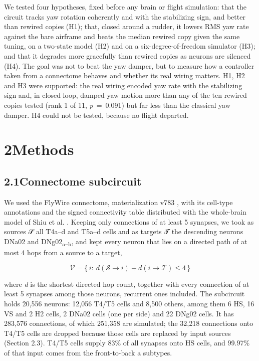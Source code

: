 \documentclass[11pt,letterpaper]{article}
\begin{document}
We tested four hypotheses, fixed before any brain or flight simulation:
that the circuit tracks yaw rotation coherently and with the stabilizing
sign, and better than rewired copies (H1); that, closed around a rudder,
it lowers RMS yaw rate against the bare airframe and beats the median
rewired copy given the same tuning, on a two-state model (H2) and on a
six-degree-of-freedom simulator (H3); and that it degrades more
gracefully than rewired copies as neurons are silenced (H4). The goal
was not to beat the yaw damper, but to measure how a controller taken
from a connectome behaves and whether its real wiring matters. H1, H2
and H3 were supported: the real wiring encoded yaw rate with the
stabilizing sign and, in closed loop, damped yaw motion more than any of
the ten rewired copies tested (rank 1 of 11, \emph{p}~=~0.091) but far
less than the classical yaw damper. H4 could not be tested, because no
flight departed.

\protect{}\label{s2}
\section{\texorpdfstring{2\quad Methods}{2Methods}}\label{methods}

\subsection{\texorpdfstring{2.1\quad Connectome
subcircuit}{2.1Connectome subcircuit}}\label{connectome-subcircuit}

\noindent We used the FlyWire connectome, materialization v783
\cite{dorkenwald2024}, with its cell-type annotations
\cite{schlegel2024} and the signed connectivity table distributed with
the whole-brain model of Shiu et al. \cite{shiu2024}. Keeping only
connections of at least 5 synapses, we took as sources 𝒮 all T4a--d and
T5a--d cells and as targets 𝒯 the descending neurons DNa02 and
DNg02\textsubscript{a--h}, and kept every neuron that lies on a directed
path of at most 4 hops from a source to a target,

\[\mathcal{V}=\bigl\{\,i:\ d(\mathcal{S}\!\to\! i)+d(i\!\to\!\mathcal{T})\le 4\,\bigr\}\tag{1}\]

\noindent where \emph{d} is the shortest directed hop count, together
with every connection of at least 5 synapses among those neurons,
recurrent ones included. The subcircuit holds 20,556 neurons: 12,056
T4/T5 cells and 8,500 others, among them 6 HS, 16 VS and 2 H2 cells, 2
DNa02 cells (one per side) and 22 DNg02 cells. It has 283,576
connections, of which 251,358 are simulated; the 32,218 connections onto
T4/T5 cells are dropped because those cells are replaced by input
sources (Section 2.3). T4/T5 cells supply 83\% of all synapses onto HS
cells, and 99.97\% of that input comes from the front-to-back a
subtypes.
\end{document}
